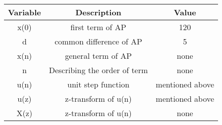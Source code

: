 \documentclass[journal,12pt,onecolumn]{IEEEtran}
\theoremstyle{remark}
\begin{document}
\begin{table}[h]
  \centering
  \begin{tabular}{|c|c|c|}
    \hline
      \textbf{Variable}& \textbf{Description}& \textbf{Value}\\\hline
    x(0)& first term of AP& 120  \\\hline
    d& common difference of AP & 5\\\hline
    x(n) & general  term of AP&none\\\hline
   n & Describing the order of term & none\\\hline
    u(n)& unit step function & mentioned above\\\hline
    u(z) & z-transform of u(n) & mentioned above\\\hline
    X(z)& z-transform of u(n) & none\\ 
    \hline
    
  \end{tabular}
  \end {table}
\end{document}
